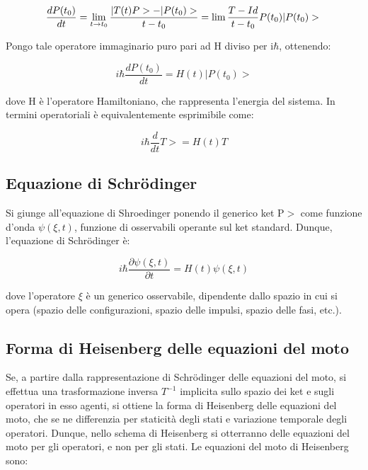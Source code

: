 \documentclass{article}
\begin{document}
\begin{equation}
     \frac{dP(t_0)}{dt}=\lim_{ t \rightarrow t_0} \frac{|T(t)P>-|P(t_0)>}{t-t_0}= \lim{\frac{T-Id}{t-t_0}P(t_0)}|P(t_0)> \\
\end{equation}

Pongo tale operatore immaginario puro pari ad H diviso per i$\hbar$, ottenendo:

\begin{equation}
   i\hbar \frac{dP(t_0)}{dt}=H(t)|P(t_0)>
\end{equation}

dove H è l'operatore Hamiltoniano, che rappresenta l'energia del sistema.
In termini operatoriali è equivalentemente esprimibile come:

\begin{equation}
    i\hbar \frac{d}{dt}T>=H(t)T
\end{equation}

\subsection{Equazione di Schrödinger}
Si giunge all'equazione di Shroedinger ponendo il generico ket P$>$ come funzione d'onda $\psi(\xi, t)$, funzione di osservabili operante sul ket standard.
Dunque, l'equazione di Schrödinger è:

\begin{equation}
    i\hbar \frac{\partial \psi(\xi, t)}{\partial t} = H(t) \psi(\xi,t)
\end{equation}

dove l'operatore $\xi$ è un generico osservabile, dipendente dallo spazio in cui si opera (spazio delle configurazioni, spazio delle impulsi, spazio delle fasi, etc.).

\subsection{Forma di Heisenberg delle equazioni del moto}
Se, a partire dalla rappresentazione di Schrödinger delle equazioni del moto, si effettua una trasformazione inversa $T^{-1}$ implicita sullo spazio dei ket
e sugli operatori in esso agenti, si ottiene la forma di Heisenberg delle equazioni del moto, che se ne differenzia per staticità degli stati e variazione temporale degli operatori.
Dunque, nello schema di Heisenberg si otterranno delle equazioni del moto per gli operatori, e non per gli stati.
Le equazioni del moto di Heisenberg sono:
\end{document}
